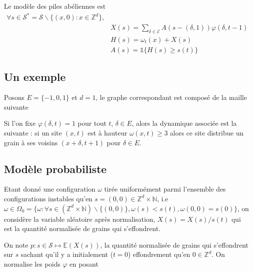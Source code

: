 \documentclass{article}
\begin{document}
Le modèle des piles abéliennes est
\begin{align*}
	\forall s\in\mathcal{S}^* = \mathcal{S}\backslash\{(x,0) : x\in\mathbb{Z}^d\}, \\
	& X(s) = \sum_{\delta\in\mathcal{E}} A(s-(\delta, 1))\varphi(\delta, t-1)\\
	& H(s) = \omega_t(x) + X(s)\\
	&A(s) = \mathds{1}\{H(s) \geq s(t)\}
\end{align*}
\subsection{Un exemple}
Posons $E=\{-1,0,1\}$ et $d=1$, le graphe correspondant est composé de la maille suivante \begin{center}  
\end{center}
Si l'on fixe $\varphi(\delta,t) = 1$ pour tout $t$, $\delta\in E$, alors la dynamique associée est la suivante : si un site $(x,t)$ est à hauteur $\omega(x,t)\geq 3$ alors ce site distribue un grain à ses voisins $(x+\delta,t+1)$ pour $\delta\in E$.

\subsection{Modèle probabiliste}
Etant donné une configuration $\omega$ tirée uniformément parmi l'ensemble des configurations instables qu'en $s=(0,0)\in\mathbb{Z}^d\times\mathbb{N}$, i.e $ \omega \in \Omega_{0} = \{\omega : \forall s\in (\mathbb{Z}^d\times\mathbb{N})\backslash\{(0,0)\}, \omega(s)<s(t), \omega(0, 0) = s(0)\}$, on considère la variable aléatoire après normalisation, $X(s)=X(s)/s(t)$ qui est la quantité normalisée de grains qui s'effondrent. 

On note $p:s\in\mathcal{S}\mapsto \mathbb{E}(X(s))$, la quantité normalisée de grains qui s'effondrent sur $s$ sachant qu'il y a initialement ($t=0$) effondrement qu'en $0\in\mathbb{Z}^d$. On normalise les poids $\varphi$ en posant 
\end{document}
